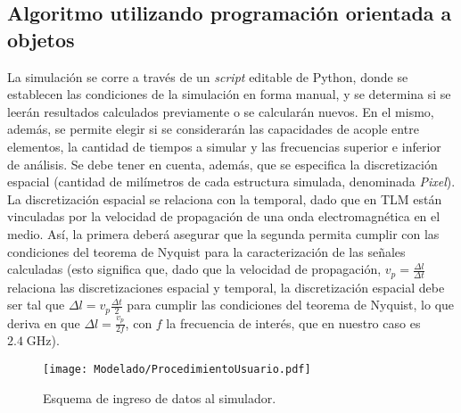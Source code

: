 
\subsection{Algoritmo utilizando programación orientada a objetos}
\label{subsec_estudio_tlm}
La simulación se corre a través de un \textit{script} editable de Python, donde se establecen las condiciones de la simulación en forma manual, y se determina si se leerán resultados calculados previamente o se calcularán nuevos. En el mismo, además, se permite elegir si se considerarán  las capacidades de acople entre elementos, la cantidad de tiempos a simular y las frecuencias superior e inferior de análisis. Se debe tener en cuenta, además, que se especifica la discretización espacial (cantidad de milímetros de cada estructura simulada, denominada \textit{Pixel}). La discretización espacial se relaciona con la temporal, dado que en TLM están vinculadas por la velocidad de propagación de una onda electromagnética en el medio. Así, la primera deberá asegurar que la segunda permita cumplir con las condiciones del teorema de Nyquist para la caracterización de las señales calculadas (esto significa que, dado que la velocidad de propagación, $v_p=\frac{\Delta l}{\Delta t}$ relaciona las discretizaciones espacial y temporal, la discretización espacial debe ser tal que $\Delta l = v_p \frac{\Delta t}{2}$ para cumplir las condiciones del teorema de Nyquist, lo que deriva en que $\Delta l = \frac{v_p}{2f}$, con $f$ la frecuencia de interés, que en nuestro caso es $2.4\;\text{GHz}$).

\begin{figure}[h]
	\centering
	\texttt{[image: Modelado/ProcedimientoUsuario.pdf]}
	\caption{Esquema de ingreso de datos al simulador.}
	\label{fig:esquema-ingreso-datos}
\end{figure}

